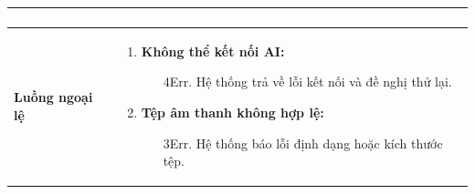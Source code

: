 {\begin{tabularx}{\textwidth}{|>{\raggedright\arraybackslash}X|>{\raggedright\arraybackslash}X|}
\begin{enumerate}
\end{enumerate} \\
\hline
\textbf{Luồng ngoại lệ} &
\begin{enumerate}
    \item \textbf{Không thể kết nối AI:}
    \begin{enumerate}
        \item[4Err.] Hệ thống trả về lỗi kết nối và đề nghị thử lại.
    \end{enumerate}
    \item \textbf{Tệp âm thanh không hợp lệ:}
    \begin{enumerate}
        \item[3Err.] Hệ thống báo lỗi định dạng hoặc kích thước tệp.
    \end{enumerate}
\end{enumerate} \\
\hline
\end{tabularx}
}
